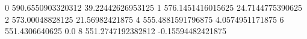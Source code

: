 0 590.6550903320312 39.22442626953125
1 576.1451416015625 24.7144775390625
2 573.00048828125 21.56982421875
4 555.4881591796875 4.0574951171875
6 551.4306640625 0.0
8 551.2747192382812 -0.15594482421875
